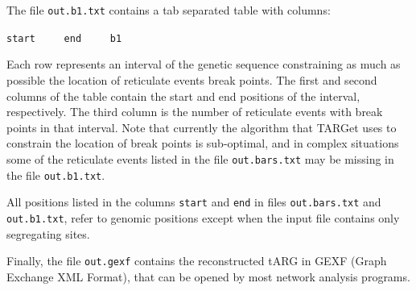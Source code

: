 \documentclass[12pt]{article}
\begin{document}
The file \texttt{out.b1.txt} contains a tab separated table with columns:

\texttt{start\ \ \ \ \ end\ \ \ \ \ b1}

\noindent Each row represents an interval of the genetic sequence constraining as much as possible the location of reticulate events break points. The first and second columns of the table contain the start and end positions of the interval, respectively. The third column is the number of reticulate events with break points in that interval. Note that currently the algorithm that TARGet uses to constrain the location of break points is sub-optimal, and in complex situations some of the reticulate events listed in the file \texttt{out.bars.txt} may be missing in the file \texttt{out.b1.txt}.

All positions listed in the columns \texttt{start} and \texttt{end} in files \texttt{out.bars.txt} and \texttt{out.b1.txt}, refer to genomic positions except when the input file contains only segregating sites.

Finally, the file \texttt{out.gexf} contains the reconstructed tARG in GEXF (Graph Exchange XML Format), that can be opened by most network analysis programs.
\end{document}
